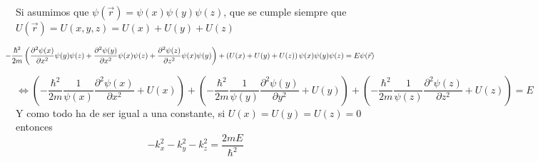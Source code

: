 \documentclass{report}
\begin{document}
  \vspace{0.3cm}
  \noindent Si asumimos que $\psi(\vec{r})=\psi(x)\psi(y)\psi(z)$, que se 
  cumple siempre que $U(\vec{r})=U(x,y,z)=U(x)+U(y)+U(z)$

  \[\hspace{-0.5cm}-\dfrac{\hbar^2}{2m}\left(\dfrac{\partial^2 \psi(x)}{\partial x^2}\psi(y)\psi(z)+
  \dfrac{\partial^2 \psi(y)}{\partial x^2}\psi(x)\psi(z)+\dfrac{\partial^2 \psi(z)}{\partial z^2}\psi(x)\psi(y)\right)+
  \left(U(x)+U(y)+U(z)\right)\psi(x)\psi(y)\psi(z)=E\psi(\vec{r})\]

  \[\Longleftrightarrow \left(-\dfrac{\hbar^2}{2m}\dfrac{1}{\psi(x)}\dfrac{\partial^2\psi(x)}{\partial x^2}+U(x)\right)+
  \left(-\dfrac{\hbar^2}{2m}\dfrac{1}{\psi(y)}\dfrac{\partial^2\psi(y)}{\partial y^2}+U(y)\right)+
  \left(-\dfrac{\hbar^2}{2m}\dfrac{1}{\psi(z)}\dfrac{\partial^2\psi(z)}{\partial z^2}+U(z)\right)=E\]
  Y como todo ha de ser igual a una constante, si $U(x)=U(y)=U(z)=0$ entonces
  \[-k_x^2-k_y^2-k_z^2=\dfrac{2mE}{\hbar^2}\]
\clearpage
\end{document}
